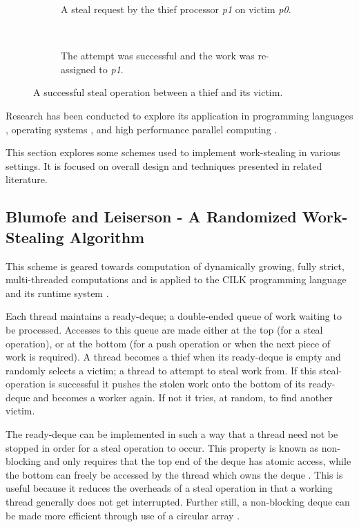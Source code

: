 \begin{figure}[h]
\centering
\begin{subfigure}[b]{0.4\textwidth}
  \centering    
  
  \caption{
    \tiny A steal request by the thief processor \textit{p1} on victim \textit{p0}.
  }
  \label{fig:stealreq}
\end{subfigure}
~~~~~~ %
\begin{subfigure}[b]{0.4\textwidth}
  \centering
  
  \caption{
    \tiny The attempt was successful and the work was re-assigned to \textit{p1}.
  }
  \label{fig:stealsuccess}
\end{subfigure}
\caption{
    A successful steal operation between a thief and its victim.
  }
\label{fig:stealoperation}
\end{figure}

Research has been conducted to explore its application in programming languages \cite{}, 
operating systems \cite{}, and high performance parallel computing \cite{}.

This section explores some schemes used to implement work-stealing in various settings. It is focused on overall design and 
techniques presented in related literature. 

\subsection{Blumofe and Leiserson - A Randomized Work-Stealing Algorithm}
\label{sec:randscheme}

This scheme is geared towards computation of dynamically growing, fully strict, multi-threaded computations and is applied to the CILK
programming language and its runtime system \cite{blumleis}. 

Each thread maintains a \gls{ready-deque}; a double-ended queue of work waiting to be processed. 
Accesses to this queue are made either at the top (for a steal operation), or at the bottom (for a push operation
or when the next piece of work is required).
A thread becomes a \gls{thief} when its ready-deque is empty and randomly selects a \gls{victim}; a thread
to attempt to steal work from. If this \gls{steal-operation} is successful it pushes the stolen work 
onto the bottom of its ready-deque and becomes a worker again. If not it tries, at random, to find another victim.

The ready-deque can be implemented in such a way that a thread need not be stopped in order for a steal operation 
to occur. This property is known as \gls{non-blocking} and only requires that the top end of the deque has atomic access,
while the bottom can freely be accessed by the thread which owns the deque \cite{narora}. This is useful because it reduces the overheads 
of a steal operation in that a working thread generally does not get interrupted. 
Further still, a non-blocking deque can be made more efficient through use of a \gls{circular array} \cite{circdeque}.

